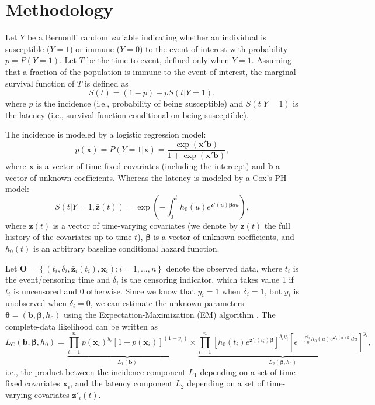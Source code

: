 \section{Methodology}

Let $Y$ be a Bernoulli random variable indicating whether an individual is susceptible ($Y=1$) or immune ($Y=0$) to the event of interest with probability $p=P(Y=1)$. Let $T$ be the time to event, defined only when $Y=1$. Assuming that a fraction of the population is immune to the event of interest, the marginal survival function of $T$ is defined as
$$S(t)=(1-p)+pS(t|Y=1),$$
where $p$ is the incidence (i.e., probability of being susceptible) and $S(t|Y=1)$ is the latency (i.e., survival function conditional on being susceptible).

The incidence is modeled by a logistic regression model:
$$p(\textbf{x})=P(Y=1|\mathbf{x})=\frac{\exp(\mathbf{x}'\textbf{b})}{1+\exp(\mathbf{x}'\textbf{b})},$$
where $\textbf{x}$ is a vector of time-fixed covariates (including the intercept) and $\mathbf{b}$ a vector of unknown coefficients. Whereas the latency is modeled by a Cox's PH model:
$$S(t|Y=1,\bar{\textbf{z}}(t))=\exp\left( - \int_0^t h_{0}(u)e^{\textbf{z}'(u)\boldsymbol{\beta} du}\right),$$ 
where $\textbf{z}(t)$ is a vector of time-varying covariates (we denote by $\bar{\textbf{z}}(t)$ the full history of the covariates up to time $t$), $\boldsymbol{\beta}$ is a vector of unknown coefficients, and $h_{0}(t)$ is an arbitrary baseline conditional hazard function. 

Let $\textbf{O}=\left\{ (t_{i},\delta_{i},\bar{\textbf{z}}_{i}(t_i),\textbf{x}_{i}) ; i=1,...,n \right \}$ denote the observed data, where $t_{i}$ is the event/censoring time and $\delta_{i}$ is the censoring indicator, which takes value 1 if $t_{i}$ is uncensored and 0 otherwise. 
Since we know that $y_i=1$ when $\delta_i=1$, but $y_i$ is unobserved when $\delta_i=0$, we can estimate the unknown parameters $\boldsymbol{\theta}=(\textbf{b},\boldsymbol{\beta},h_{0})$ using the Expectation-Maximization (EM) algorithm \citep{Dempster_1977}. The complete-data likelihood can be written as
\begin{equation}
\label{eq:comp_data_likelihood}
L_{C}\left(\textbf{b},\boldsymbol{\beta},h_{0}\right)=\underbrace{ \prod_{i=1}^{n}p(\textbf{x}_i)^{y_{i}}\left[1-p(\textbf{x}_i)\right]^{(1-y_{i})} }_{L_{1}(\textbf{b})} \times \underbrace{ \prod_{i=1}^{n}\left[h_{0}(t_{i})e^{\textbf{z}'_{i}(t_{i})\boldsymbol{\beta}}\right]^{\delta_{i}y_{i}}\left[e^{-\int_{0}^{t_i}h_{0}(u)e^{\textbf{z}'_{i}(u)\boldsymbol{\beta}}\ du}\right]^{y_{i}} }_{L_{2}(\boldsymbol{\beta},h_{0})},
\end{equation}
i.e., the product between the incidence component $L_{1}$ depending on a set of time-fixed covariates $\textbf{x}_i$, and the latency component $L_{2}$ depending on a set of time-varying covariates $\textbf{z}'_{i}(t)$.

